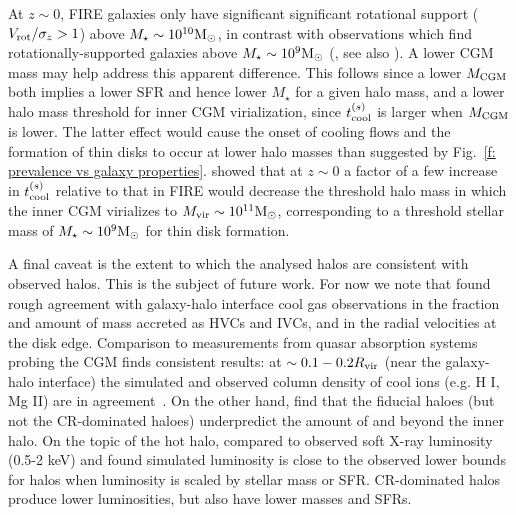 \documentclass[fleqn,usenatbib]{mnras}
\newcommand{\msun}{{\rm M}_\odot}
\begin{document}
At $z\sim0$, FIRE galaxies only have significant significant rotational support ($V_{\rm rot}/\sigma_z > 1$) above $M_\star\sim10^{10}\msun$, in contrast with observations which find rotationally-supported galaxies above $M_\star\sim10^9\msun$ (\citealt{El-Badry2018a, El-Badry2018}, see also \citealt{Peebles2020}).
A lower CGM mass may help address this apparent difference.
This follows since a lower $M_{\rm CGM}$ both implies a lower SFR and hence lower $M_\star$ for a given halo mass, and a lower halo mass threshold for inner CGM virialization, since $t_{\rm cool}^{(s)}$ is larger when $M_{\rm CGM}$ is lower. 
The latter effect would cause the onset of cooling flows and the formation of thin disks to occur at lower halo masses than suggested by Fig.~\ref{f: prevalence vs galaxy properties}.
\cite{Stern2021} showed that at $z\sim0$ a factor of a few increase in $t_{\rm cool}^{(s)}$ relative to that in FIRE would decrease the threshold halo mass in which the inner CGM virializes to $M_{\rm vir}\sim10^{11}\msun$, corresponding to a threshold stellar mass of $M_\star\sim10^9\msun$ for thin disk formation.

A final caveat is the extent to which the analysed halos are consistent with observed halos.
This is the subject of future work.
For now we note that \cite{Trapp2021} found rough agreement with galaxy-halo interface cool gas observations in the fraction and amount of mass accreted as HVCs and IVCs, and in the radial velocities at the disk edge.
Comparison to measurements from quasar absorption systems probing the CGM finds consistent results:
at $\sim 0.1-0.2 R_{\rm vir}$ (near the galaxy-halo interface) the simulated and observed column density of cool ions (e.g. H I, Mg II) are in agreement~\cite{Ji2020}.
On the other hand, \citeauthor {Ji2020} find that the fiducial haloes (but not the CR-dominated haloes) underpredict the amount of  and  beyond the inner halo.
On the topic of the hot halo, \cite{Chan2021} compared to observed soft X-ray luminosity (0.5-2 keV) and found simulated luminosity is close to the observed lower bounds for halos when luminosity is scaled by stellar mass or SFR.
CR-dominated halos produce lower luminosities, but also have lower masses and SFRs.

\end{document}
